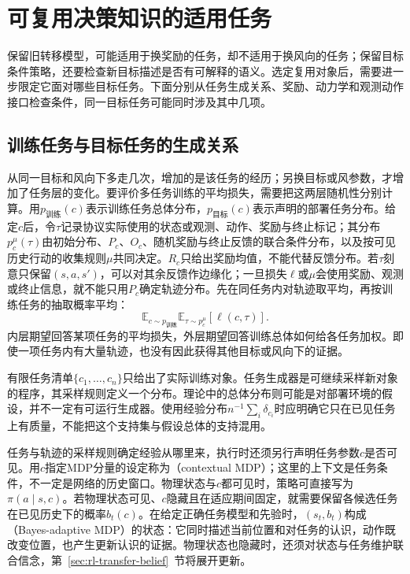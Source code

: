 \section{可复用决策知识的适用任务}
\label{sec:rl-transfer-applicability}

保留旧转移模型，可能适用于换奖励的任务，却不适用于换风向的任务；保留目标条件策略，还要检查新目标描述是否有可解释的语义。选定复用对象后，需要进一步限定它面对哪些目标任务。下面分别从任务生成关系、奖励、动力学和观测动作接口检查条件，同一目标任务可能同时涉及其中几项。

\subsection{训练任务与目标任务的生成关系}
\label{sec:rl-transfer-distributions}

从同一目标和风向下多走几次，增加的是该任务的经历；另换目标或风参数，才增加了任务层的变化。要评价多任务训练的平均损失，需要把这两层随机性分别计算。用$p_{\text{训练}}(c)$表示训练任务总体分布，$p_{\text{目标}}(c)$表示声明的部署任务分布。给定$c$后，令$\tau$记录协议实际使用的状态或观测、动作、奖励与终止标记；其分布$p_c^\mu(\tau)$由初始分布、$P_c$、$O_c$、随机奖励与终止反馈的联合条件分布，以及按可见历史行动的收集规则$\mu$共同决定。$R_c$只给出奖励均值，不能代替反馈分布。若$\tau$刻意只保留$(s,a,s')$，可以对其余反馈作边缘化；一旦损失$\ell$或$\mu$会使用奖励、观测或终止信息，就不能只用$P_c$确定轨迹分布。先在同任务内对轨迹取平均，再按训练任务的抽取概率平均：
\[
  \mathbb E_{c\sim p_{\text{训练}}}
  \mathbb E_{\tau\sim p_c^\mu}[\ell(c,\tau)].
\]
内层期望回答某项任务的平均损失，外层期望回答训练总体如何给各任务加权。即使一项任务内有大量轨迹，也没有因此获得其他目标或风向下的证据。

有限任务清单$\{c_1,\ldots,c_n\}$只给出了实际训练对象。任务生成器是可继续采样新对象的程序，其采样规则定义一个分布。理论中的总体分布则可能是对部署环境的假设，并不一定有可运行生成器。使用经验分布$n^{-1}\sum_i\delta_{c_i}$时应明确它只在已见任务上有质量，不能把这个支持集与假设总体的支持混用。

任务与轨迹的采样规则确定经验从哪里来，执行时还须另行声明任务参数$c$是否可见。用$c$指定MDP分量的设定称为（contextual MDP）；这里的上下文是任务条件，不一定是网络的历史窗口。物理状态与$c$都可见时，策略可直接写为$\pi(a\mid s,c)$。若物理状态可见、$c$隐藏且在适应期间固定，就需要保留各候选任务在已见历史下的概率$b_t(c)$。在给定正确任务模型和先验时，$(s_t,b_t)$构成（Bayes-adaptive MDP）的状态：它同时描述当前位置和对任务的认识，动作既改变位置，也产生更新认识的证据。物理状态也隐藏时，还须对状态与任务维护联合信念，第~\ref{sec:rl-transfer-belief}~节将展开更新。

